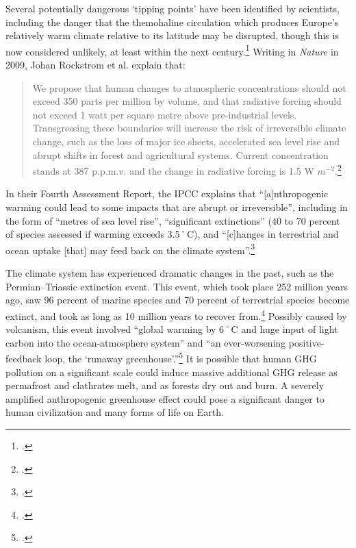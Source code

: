Several potentially dangerous `tipping points' have been identified by scientists, including the danger that the themohaline circulation which produces Europe's relatively warm climate relative to its latitude may be disrupted, though this is now considered unlikely, at least within the next century.\footcite[][]{IPCCThermohaline}
Writing in \emph{Nature} in 2009, Johan Rockstrom et al. explain that:
\begin{quote}
We propose that human changes to atmospheric  concentrations should not exceed 350 parts per million by volume, and that radiative forcing should not exceed 1 watt per square metre above pre-industrial levels. Transgressing these boundaries will increase the risk of irreversible climate change, such as the loss of major ice sheets, accelerated sea level rise and abrupt shifts in forest and agricultural systems. Current  concentration stands at 387 p.p.m.v. and the change in radiative forcing is 1.5 W $m^{−2}$.\footcite[][]{SafeOperatingSpace}
\end{quote}
In their Fourth Assessment Report, the IPCC explains that ``[a]nthropogenic warming could lead to some impacts that are abrupt or irreversible'', including in the form of ``metres of sea level rise'', ``significant extinctions'' (40 to 70 percent of species assessed if warming exceeds 3.5˚C), and ``[c]hanges in terrestrial and ocean  uptake [that] may feed back on the climate system''.\footcite[][p. 53]{IPCCar4_syr}



The climate system has experienced dramatic changes in the past, such as the Permian–Triassic extinction event.
This event, which took place 252 million years ago, saw 96 percent of marine species and 70 percent of terrestrial species become extinct, and took as long as 10 million years to recover from.\footcite[][p. 759--765]{PTRecovery}
Possibly caused by volcanism, this event involved ``global warming by 6˚C and huge input of light carbon into the ocean-atmosphere system'' and ``an ever-worsening positive-feedback loop, the `runaway greenhouse'.''\footcite[][p. 358]{EndPermian}
It is possible that human GHG pollution on a significant scale could induce massive additional GHG release as permafrost and clathrates melt, and as forests dry out and burn.
A severely amplified anthropogenic greenhouse effect could pose a significant danger to human civilization and many forms of life on Earth.



